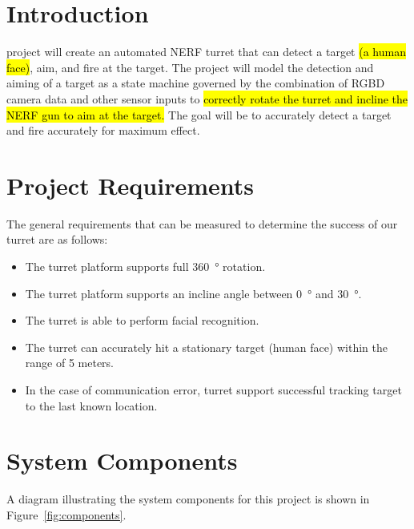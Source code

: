 \documentclass[journal]{IEEEtran}
\begin{document}

\section{Introduction}

 project will create an automated NERF turret that can detect a target \hl{(a human face)}, aim, and fire at the target. The project will model the detection and aiming of a target as a state machine governed by the combination of RGBD camera data and other sensor inputs to \hl{correctly rotate the turret and incline the NERF gun to aim at the target.} The goal will be to accurately detect a target and fire accurately for maximum effect.

\section{Project Requirements}

The general requirements that can be measured to determine the success of our turret are as follows:
\begin{itemize}
\item
The turret platform supports full \SI{360}{\degree} rotation.
\item
The turret platform supports an incline angle between \SI{0}{\degree} and \SI{30}{\degree}.
\item
The turret is able to perform facial recognition.
\item
The turret can accurately hit a stationary target (human face) within the range of 5 meters.
\item
In the case of communication error, turret support successful tracking target to the last known location. 
\end{itemize}

\section{System Components}

A diagram illustrating the system components for this project is shown in Figure~\ref{fig:components}. 
\end{document}
